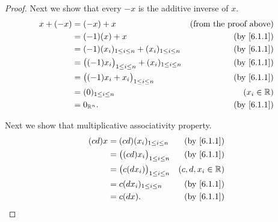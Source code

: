 \begin{proof}
  Next we show that every \(-x\) is the additive inverse of \(x\).
  \begin{align*}
    x + (-x) & = (-x) + x                                                      & \text{(from the proof above)} \\
             & = (-1)(x) + x                                                   & \text{(by \cref{6.1.1})}      \\
             & = (-1)(x_i)_{1 \leq i \leq n} + (x_i)_{1 \leq i \leq n}         & \text{(by \cref{6.1.1})}      \\
             & = \big((-1)x_i\big)_{1 \leq i \leq n} + (x_i)_{1 \leq i \leq n} & \text{(by \cref{6.1.1})}      \\
             & = \big((-1)x_i + x_i\big)_{1 \leq i \leq n}                     & \text{(by \cref{6.1.1})}      \\
             & = (0)_{1 \leq i \leq n}                                         & (x_i \in \R)                  \\
             & = 0_{\R^n}.                                                     & \text{(by \cref{6.1.1})}
  \end{align*}

  Next we show that multiplicative associativity property.
  \begin{align*}
    (cd)x & = (cd)(x_i)_{1 \leq i \leq n}          & \text{(by \cref{6.1.1})} \\
          & = \big((cd) x_i\big)_{1 \leq i \leq n} & \text{(by \cref{6.1.1})} \\
          & = \big(c(d x_i)\big)_{1 \leq i \leq n} & (c, d, x_i \in \R)       \\
          & = c(d x_i)_{1 \leq i \leq n}           & \text{(by \cref{6.1.1})} \\
          & = c(dx).                               & \text{(by \cref{6.1.1})}
  \end{align*}


\end{proof}
